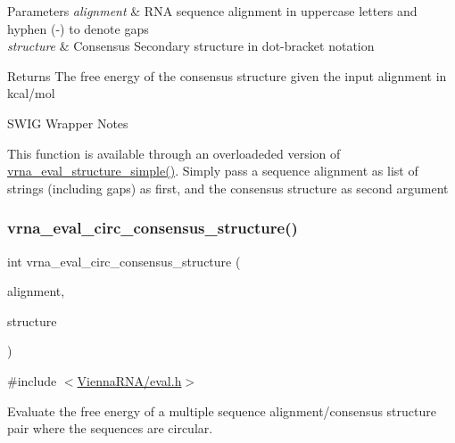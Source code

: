 \begin{DoxyParams}{Parameters}
{\em alignment} & R\+NA sequence alignment in uppercase letters and hyphen (\textquotesingle{}-\/\textquotesingle{}) to denote gaps \\
\hline
{\em structure} & Consensus Secondary structure in dot-\/bracket notation \\
\hline
\end{DoxyParams}
\begin{DoxyReturn}{Returns}
The free energy of the consensus structure given the input alignment in kcal/mol
\end{DoxyReturn}
\begin{DoxyRefDesc}{S\+W\+I\+G Wrapper Notes}
\item[\hyperlink{wrappers__wrappers000045}{S\+W\+I\+G Wrapper Notes}]This function is available through an overloadeded version of \hyperlink{group__eval_ga7e5273464b775d4130245681312c1369}{vrna\+\_\+eval\+\_\+structure\+\_\+simple()}. Simply pass a sequence alignment as list of strings (including gaps) as first, and the consensus structure as second argument \end{DoxyRefDesc}
\mbox{\label{group__eval_gac96577cf232c71160f762737a994b7c6}} 
\subsubsection{\texorpdfstring{vrna\+\_\+eval\+\_\+circ\+\_\+consensus\+\_\+structure()}{vrna\_eval\_circ\_consensus\_structure()}}
{\footnotesize\ttfamily int vrna\+\_\+eval\+\_\+circ\+\_\+consensus\+\_\+structure (\begin{DoxyParamCaption}\item[{const char $\ast$$\ast$}]{alignment,  }\item[{const char $\ast$}]{structure }\end{DoxyParamCaption})}



{\ttfamily \#include $<$\hyperlink{eval_8h}{Vienna\+R\+N\+A/eval.\+h}$>$}



Evaluate the free energy of a multiple sequence alignment/consensus structure pair where the sequences are circular. 

